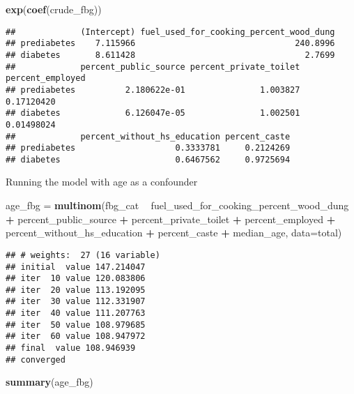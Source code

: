 \documentclass[]{article}
\newenvironment{Shaded}{\begin{snugshade}}{\end{snugshade}}
\newcommand{\DataTypeTok}[1]{\textcolor[rgb]{0.13,0.29,0.53}{#1}}
\newcommand{\KeywordTok}[1]{\textcolor[rgb]{0.13,0.29,0.53}{\textbf{#1}}}
\newcommand{\NormalTok}[1]{#1}
\newcommand{\OperatorTok}[1]{\textcolor[rgb]{0.81,0.36,0.00}{\textbf{#1}}}
\newcommand{\StringTok}[1]{\textcolor[rgb]{0.31,0.60,0.02}{#1}}
\begin{document}
\begin{Shaded}
\begin{Highlighting}[]
\KeywordTok{exp}\NormalTok{(}\KeywordTok{coef}\NormalTok{(crude_fbg))}
\end{Highlighting}
\end{Shaded}

\begin{verbatim}
##             (Intercept) fuel_used_for_cooking_percent_wood_dung
## prediabetes    7.115966                                240.8996
## diabetes       8.611428                                  2.7699
##             percent_public_source percent_private_toilet percent_employed
## prediabetes          2.180622e-01               1.003827       0.17120420
## diabetes             6.126047e-05               1.002501       0.01498024
##             percent_without_hs_education percent_caste
## prediabetes                    0.3333781     0.2124269
## diabetes                       0.6467562     0.9725694
\end{verbatim}

Running the model with age as a confounder

\begin{Shaded}
\begin{Highlighting}[]
\NormalTok{age_fbg =}\StringTok{ }
\StringTok{  }\KeywordTok{multinom}\NormalTok{(fbg_cat }\OperatorTok{~}\StringTok{ }\NormalTok{fuel_used_for_cooking_percent_wood_dung }\OperatorTok{+}\StringTok{ }\NormalTok{percent_public_source }\OperatorTok{+}\StringTok{ }\NormalTok{percent_private_toilet }\OperatorTok{+}\StringTok{ }\NormalTok{percent_employed }\OperatorTok{+}\StringTok{ }\NormalTok{percent_without_hs_education }\OperatorTok{+}\StringTok{ }\NormalTok{percent_caste }\OperatorTok{+}\StringTok{ }\NormalTok{median_age, }\DataTypeTok{data=}\NormalTok{total)}
\end{Highlighting}
\end{Shaded}

\begin{verbatim}
## # weights:  27 (16 variable)
## initial  value 147.214047 
## iter  10 value 120.083806
## iter  20 value 113.192095
## iter  30 value 112.331907
## iter  40 value 111.207763
## iter  50 value 108.979685
## iter  60 value 108.947972
## final  value 108.946939 
## converged
\end{verbatim}

\begin{Shaded}
\begin{Highlighting}[]
\KeywordTok{summary}\NormalTok{(age_fbg)}
\end{Highlighting}
\end{Shaded}
\end{document}

